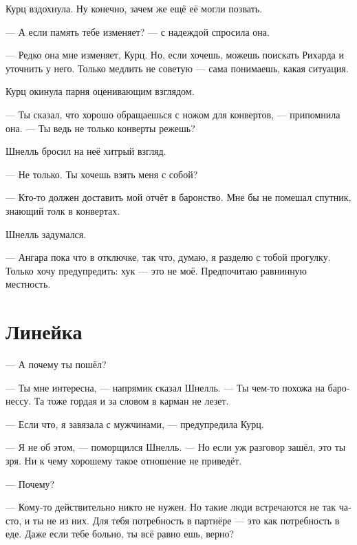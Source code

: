 \documentclass[a4paper,10pt,fleqn]{book}\usepackage{polyglossia}\setdefaultlanguage[babelshorthands=true]{russian}\setotherlanguage{english}\defaultfontfeatures{Ligatures=TeX,Mapping=tex-text}\usepackage{xcolor}\newcommand{\ml}[3]{#2}
\begin{document}
Курц вздохнула.
Ну конечно, зачем же ещё её могли позвать.

\ml{$0$}
{--- А если память тебе изменяет? --- с надеждой спросила она.}
{``Is there any chance you recall incorrectly?'' she asked with hope.}

\ml{$0$}
{--- Редко она мне изменяет, Курц.}
{``That happens very rarely, Kurz.}
\ml{$0$}
{Но, если хочешь, можешь поискать Рихарда и уточнить у него.}
{But, if you insist, you can look for Richard and clear it with him.}
Только медлить не советую --- сама понимаешь, какая ситуация.

Курц окинула парня оценивающим взглядом.

--- Ты сказал, что хорошо обращаешься с ножом для конвертов, --- припомнила она.
\ml{$0$}
{--- Ты ведь не только конверты режешь?}
{``Your knife is good not only for envelopes, isn't it?''}

Шнелль бросил на неё хитрый взгляд.

\ml{$0$}
{--- Не только.}
{``Not only.}
\ml{$0$}
{Ты хочешь взять меня с собой?}
{Do you want me to go with you?''}

--- Кто-то должен доставить мой отчёт в баронство.
\ml{$0$}
{Мне бы не помешал спутник, знающий толк в конвертах.}
{I could use a companion who knows envelopes.''}

Шнелль задумался.

--- Ангара пока что в отключке, так что, думаю, я разделю с тобой прогулку.
\ml{$0$}
{Только хочу предупредить: хук --- это не моё.}
{Just a fair warning: hook is not my piece of pie.}
\ml{$0$}
{Предпочитаю равнинную местность.}
{I prefer flat terrain.''}

\section{Линейка}

--- А почему ты пошёл?

--- Ты мне интересна, --- напрямик сказал Шнелль.
--- Ты чем-то похожа на баронессу.
Та тоже гордая и за словом в карман не лезет.

--- Если что, я завязала с мужчинами, --- предупредила Курц.

--- Я не об этом, --- поморщился Шнелль.
--- Но если уж разговор зашёл, это ты зря.
Ни к чему хорошему такое отношение не приведёт.

--- Почему?

--- Кому-то действительно никто не нужен.
Но такие люди встречаются не так часто, и ты не из них.
Для тебя потребность в партнёре --- это как потребность в еде.
Даже если тебе больно, ты всё равно ешь, верно?
\end{document}
